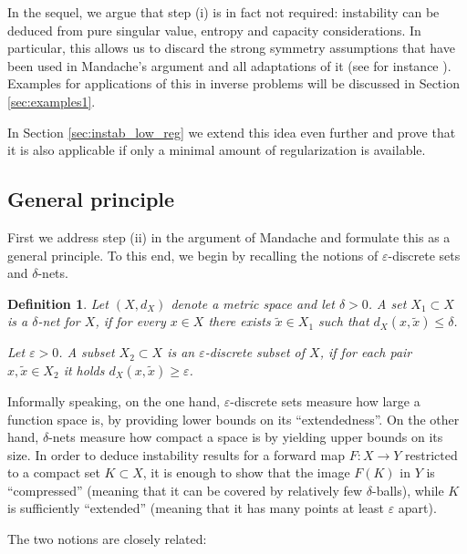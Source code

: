 \documentclass[12pt,twoside]{amsart}
\numberwithin{equation}{section}
\renewcommand{\leq}{\leqslant}
\renewcommand{\geq}{\geqslant}
\newtheorem{definition}[theorem]{Definition}
\newcommand{\eps}{\varepsilon}
\begin{document}
In the sequel, we argue that step (i) is in fact not required: instability can be deduced from pure singular value, entropy and capacity considerations. In particular, this allows us to discard the strong symmetry assumptions that have been used in Mandache's argument and all adaptations of it (see for instance \cite{DiCristoRondi,Isaev,IsaevI,IsaevII}). Examples for applications of this in inverse problems will be discussed in Section \ref{sec:examples1}.

In Section \ref{sec:instab_low_reg} we extend this idea even further and prove that it is also applicable if only a minimal amount of regularization is available.

\subsection{General principle}

First we address step (ii) in the argument of Mandache and formulate this as a general principle. To this end, we begin by recalling the notions of $\eps$-discrete sets and $\delta$-nets.  

\begin{definition}
\label{eq:discrete_net}
Let $(X,d_X)$ denote a metric space and let $\delta >0$. A set $X_1 \subset X$ is a $\delta$-net for $X$, if for every $x\in X$ there exists $\tilde{x}\in X_1$ such that $d_X(x,\tilde{x}) \leq \delta$. 

Let $\eps>0$. A subset $X_2 \subset X$ is an $\eps$-discrete subset of $X$, if for each pair $x,\tilde{x} \in X_2$ it holds $d_X(x,\tilde{x})\geq \eps$.    
\end{definition}

Informally speaking, on the one hand, $\eps$-discrete sets measure how large a function space is, by providing lower bounds on its ``extendedness''. On the other hand, $\delta$-nets measure how compact a space is by yielding upper bounds on its size. In order to deduce instability results for a forward map $F: X \to Y$ restricted to a compact set $K \subset X$, it is enough to show that the image $F(K)$ in $Y$ is ``compressed'' (meaning that it can be covered by relatively few $\delta$-balls), while $K$ is sufficiently ``extended'' (meaning that it has many points at least $\eps$ apart).

The two notions are closely related:
\end{document}
